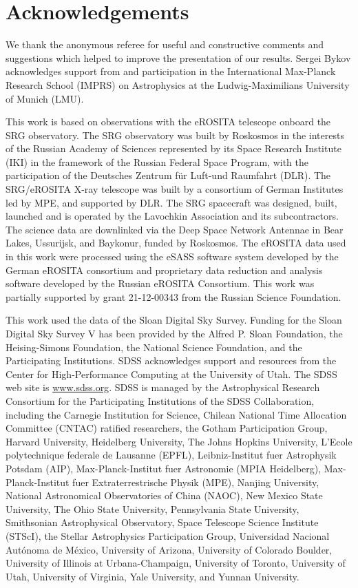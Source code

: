 \documentclass[fleqn,usenatbib]{mnras}
\begin{document}
\section*{Acknowledgements}
We thank the anonymous referee for useful and constructive comments and suggestions which helped to improve the presentation of our results.
Sergei Bykov acknowledges support from and participation in the International Max-Planck Research School (IMPRS) on Astrophysics at the Ludwig-Maximilians University of Munich (LMU).  



This work is based on observations with the eROSITA telescope onboard the SRG observatory. The SRG observatory was built by Roskosmos in the interests of the Russian Academy of Sciences represented by its Space Research Institute (IKI) in the framework of the Russian Federal Space Program, with the participation of the Deutsches Zentrum für Luft-und Raumfahrt (DLR). The SRG/eROSITA X-ray telescope was built by a consortium of German Institutes led by MPE, and supported by DLR.  The SRG spacecraft was designed, built, launched and is operated by the Lavochkin Association and its subcontractors. The science data are downlinked via the Deep Space Network Antennae in Bear Lakes, Ussurijsk, and Baykonur, funded by Roskosmos. The eROSITA data used in this work were processed using the eSASS software system developed by the German eROSITA consortium and proprietary data reduction and analysis software developed by the Russian eROSITA Consortium. This work was partially supported by grant 21-12-00343 from the Russian Science Foundation.


This work used the data of the Sloan Digital Sky Survey. Funding for the Sloan Digital Sky Survey V has been provided by the Alfred P. Sloan Foundation, the Heising-Simons Foundation, the National Science Foundation, and the Participating Institutions. SDSS acknowledges support and resources from the Center for High-Performance Computing at the University of Utah. The SDSS web site is \url{www.sdss.org}. SDSS is managed by the Astrophysical Research Consortium for the Participating Institutions of the SDSS Collaboration, including the Carnegie Institution for Science, Chilean National Time Allocation Committee (CNTAC) ratified researchers, the Gotham Participation Group, Harvard University, Heidelberg University, The Johns Hopkins University, L’Ecole polytechnique federale de Lausanne (EPFL), Leibniz-Institut fuer Astrophysik Potsdam (AIP), Max-Planck-Institut fuer Astronomie (MPIA Heidelberg), Max-Planck-Institut fuer Extraterrestrische Physik (MPE), Nanjing University, National Astronomical Observatories of China (NAOC), New Mexico State University, The Ohio State University, Pennsylvania State University, Smithsonian Astrophysical Observatory, Space Telescope Science Institute (STScI), the Stellar Astrophysics Participation Group, Universidad Nacional Aut\'{o}noma de M\'{e}xico, University of Arizona, University of Colorado Boulder, University of Illinois at Urbana-Champaign, University of Toronto, University of Utah, University of Virginia, Yale University, and Yunnan University.
\end{document}
